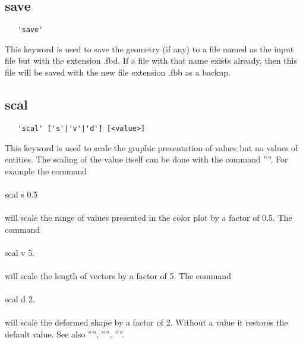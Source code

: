 \documentclass{article}
\begin{document}
\subsection{\label{save}save}
\begin{verbatim}
   'save' 
\end{verbatim}
This keyword is used to save the geometry (if any) to a file named as the input file but with the extension .fbd. If a file with that name exists already, then this file will be saved with the new file extension .fbb as a backup.
 
\subsection{\label{scal}scal}
\begin{verbatim}
   'scal' ['s'|'v'|'d'] [<value>]
\end{verbatim}
This keyword is used to scale the graphic presentation of values but no values of entities. The scaling of the value itself can be done with the command ''''. For example the command\\\\scal s 0.5\\\\will scale the range of values presented in the color plot by a factor of 0.5. The command\\\\scal v 5.\\\\will scale the length of vectors by a factor of 5. The command\\\\scal d 2.\\\\will scale the deformed shape by a factor of 2. Without a value it restores the default value. See also '''', '''', ''''.
\end{document}
